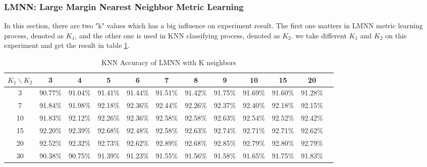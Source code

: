 \subsubsection{LMNN: Large Margin Nearest Neighbor Metric Learning}
In this section, there are two "k" values which has a big influence on experiment result. The first one matters in LMNN metric learning process, denoted as $K_1$,  and the other one is used in KNN classifying process, denoted as $K_2$. we take different $K_1$ and $K_2$ on this experiment and get the result in table \ref{tab:lmnn_k}.
\begin{table}[htbp]
\centering
\caption{KNN Accuracy of LMNN with K neighbors}
\scriptsize
\begin{tabular}{@{}cccccccccccc@{}}
\toprule
$K_1 \backslash K_2$ & 3 & 4 & 5 & 6 & 7 & 8 & 9 & 10 & 15 & 20 \\ \midrule
3 & 90.77\% & 91.04\% & 91.41\% & 91.44\% & 91.51\% & 91.42\% & 91.75\% & 91.69\% & 91.60\% & 91.28\% \\
7 & 91.84\% & 91.98\% & 92.18\% & 92.36\% & 92.44\% & 92.26\% & 92.37\% & 92.40\% & 92.18\% & 92.15\% \\
10 & 91.83\% & 92.12\% & 92.26\% & 92.36\% & 92.58\% & 92.58\% & 92.63\% & 92.54\% & 92.52\% & 92.42\% \\
15 & 92.20\% & 92.39\% & 92.68\% & 92.48\% & 92.58\% & 92.63\% & 92.74\% & 92.71\% & 92.71\% & 92.62\% \\
20 & 92.52\% & 92.32\% & 92.73\% & 92.62\% & 92.89\% & 92.68\% & 92.85\% & 92.79\% & 92.80\% & 92.79\% \\
30 & 90.38\% & 90.75\% & 91.39\% & 91.23\% & 91.55\% & 91.56\% & 91.58\% & 91.65\% & 91.75\% & 91.83\% \\
\bottomrule
\end{tabular}
\label{tab:lmnn_k}
\end{table}

